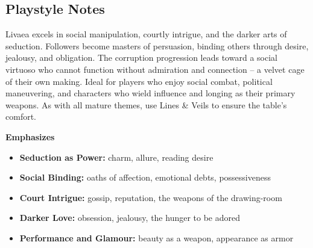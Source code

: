 \subsection*{Playstyle Notes}
Livaea excels in social manipulation, courtly intrigue, and the darker arts of seduction. Followers become masters of persuasion, binding others through desire, jealousy, and obligation. The corruption progression leads toward a social virtuoso who cannot function without admiration and connection -- a velvet cage of their own making. Ideal for players who enjoy social combat, political maneuvering, and characters who wield influence and longing as their primary weapons. As with all mature themes, use Lines \& Veils to ensure the table's comfort.

\noindent\textbf{Emphasizes}
\begin{itemize}
  \item \textbf{Seduction as Power:} charm, allure, reading desire
  \item \textbf{Social Binding:} oaths of affection, emotional debts, possessiveness
  \item \textbf{Court Intrigue:} gossip, reputation, the weapons of the drawing-room
  \item \textbf{Darker Love:} obsession, jealousy, the hunger to be adored
  \item \textbf{Performance and Glamour:} beauty as a weapon, appearance as armor
\end{itemize}